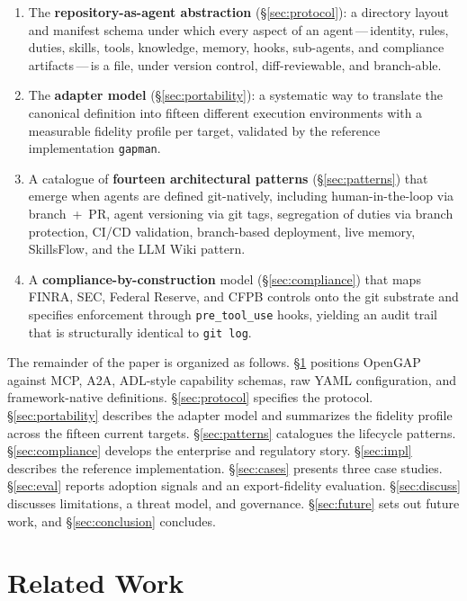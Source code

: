 \documentclass[11pt,a4paper]{article}
\begin{document}
\begin{enumerate}
  \item The \textbf{repository-as-agent abstraction} (\S\ref{sec:protocol}): a directory
  layout and manifest schema under which every aspect of an agent\,---\,identity,
  rules, duties, skills, tools, knowledge, memory, hooks, sub-agents, and compliance
  artifacts\,---\,is a file, under version control, diff-reviewable, and branch-able.
  \item The \textbf{adapter model} (\S\ref{sec:portability}): a systematic way to
  translate the canonical definition into fifteen different execution environments with
  a measurable fidelity profile per target, validated by the reference implementation
  \texttt{gapman}.
  \item A catalogue of \textbf{fourteen architectural patterns}
  (\S\ref{sec:patterns}) that emerge when agents are defined git-natively, including
  human-in-the-loop via branch~+~PR, agent versioning via git tags, segregation of
  duties via branch protection, CI/CD validation, branch-based deployment, live memory,
  SkillsFlow, and the LLM Wiki pattern.
  \item A \textbf{compliance-by-construction} model (\S\ref{sec:compliance}) that maps
  FINRA, SEC, Federal Reserve, and CFPB controls onto the git substrate and specifies
  enforcement through \texttt{pre\_tool\_use} hooks, yielding an audit trail that is
  structurally identical to \texttt{git log}.
\end{enumerate}

The remainder of the paper is organized as follows.
\S\ref{sec:related} positions OpenGAP against MCP, A2A, ADL-style capability
schemas, raw YAML configuration, and framework-native definitions.
\S\ref{sec:protocol} specifies the protocol.
\S\ref{sec:portability} describes the adapter model and summarizes the fidelity
profile across the fifteen current targets.
\S\ref{sec:patterns} catalogues the lifecycle patterns.
\S\ref{sec:compliance} develops the enterprise and regulatory story.
\S\ref{sec:impl} describes the reference implementation.
\S\ref{sec:cases} presents three case studies.
\S\ref{sec:eval} reports adoption signals and an export-fidelity evaluation.
\S\ref{sec:discuss} discusses limitations, a threat model, and governance.
\S\ref{sec:future} sets out future work, and \S\ref{sec:conclusion} concludes.

\section{Related Work}\label{sec:related}
\end{document}
